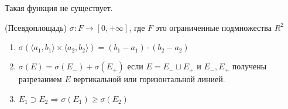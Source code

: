 \begin{remark}
    Такая функция не существует.
\end{remark}

\begin{definition}(Псевдоплощадь) $\sigma : F \rightarrow [0, +\infty]$, где $F$ это ограниченные подмножества $R^2$
    \begin{enumerate}
        \item $\sigma(\langle a_1, b_1\rangle \times \langle a_2, b_2\rangle) = (b_1 - a_1) \cdot (b_2 - a_2)$

        \item $\sigma(E) = \sigma(E_-) + \sigma(E_+)$ если $E = E_- \sqcup E_+$ и $E_-, E_+$ получены разрезанием $E$ вертикальной или
        горизонтальной линией.

        \item $E_1 \supset E_2 \Rightarrow \sigma(E_1) \geq \sigma(E_2)$ 
    \end{enumerate}
    
\end{definition}

